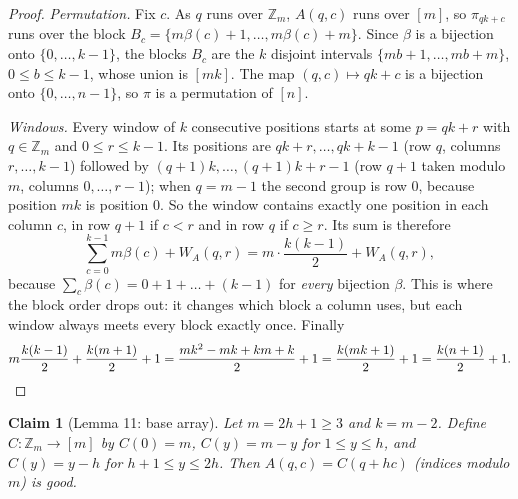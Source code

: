\documentclass[11pt]{amsart}
\newtheorem{claim}{Claim}
\theoremstyle{remark}
\newcommand{\Z}{\mathbb{Z}}
\begin{document}
\begin{proof}
\emph{Permutation.} Fix $c$. As $q$ runs over $\Z_m$, $A(q,c)$ runs over $[m]$, so $\pi_{qk+c}$ runs over the block
$B_c=\{m\beta(c)+1,\dots,m\beta(c)+m\}$. Since $\beta$ is a bijection onto $\{0,\dots,k-1\}$, the blocks $B_c$ are
the $k$ disjoint intervals $\{mb+1,\dots,mb+m\}$, $0\le b\le k-1$, whose union is $[mk]$. The map $(q,c)\mapsto qk+c$
is a bijection onto $\{0,\dots,n-1\}$, so $\pi$ is a permutation of $[n]$.

\emph{Windows.} Every window of $k$ consecutive positions starts at some $p=qk+r$ with $q\in\Z_m$ and $0\le r\le k-1$.
Its positions are $qk+r,\dots,qk+k-1$ (row $q$, columns $r,\dots,k-1$) followed by $(q+1)k,\dots,(q+1)k+r-1$ (row
$q+1$ taken modulo $m$, columns $0,\dots,r-1$); when $q=m-1$ the second group is row $0$, because position $mk$ is
position $0$. So the window contains exactly one position in each column $c$, in row $q+1$ if $c<r$ and in row $q$
if $c\ge r$. Its sum is therefore
\[
\sum_{c=0}^{k-1}m\beta(c)+W_A(q,r)=m\cdot\frac{k(k-1)}2+W_A(q,r),
\]
because $\sum_c\beta(c)=0+1+\dots+(k-1)$ for \emph{every} bijection $\beta$. This is where the block order drops out:
it changes which block a column uses, but each window always meets every block exactly once. Finally
\[
m\frac{k(k-1)}2+\frac{k(m+1)}2+1=\frac{mk^2-mk+km+k}2+1=\frac{k(mk+1)}2+1=\frac{k(n+1)}2+1. \qedhere
\]
\end{proof}

\begin{claim}[Lemma 11: base array]
Let $m=2h+1\ge3$ and $k=m-2$. Define $C:\Z_m\to[m]$ by $C(0)=m$, $C(y)=m-y$ for $1\le y\le h$, and $C(y)=y-h$ for
$h+1\le y\le 2h$. Then $A(q,c)=C(q+hc)$ (indices modulo $m$) is good.
\end{claim}
\end{document}
